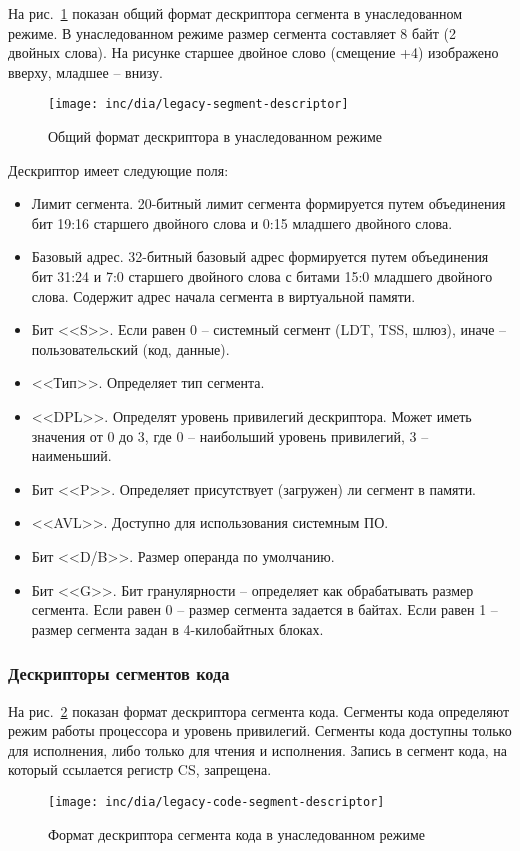 На рис.~\ref{fig:legacy-segment-descriptor-format} показан общий формат дескриптора сегмента в унаследованном режиме.
В унаследованном режиме размер сегмента составляет 8 байт (2 двойных слова). На рисунке старшее двойное слово (смещение +4)
изображено вверху, младшее -- внизу.

\begin{figure}[ht!]
  \centering
  \texttt{[image: inc/dia/legacy-segment-descriptor]}
  \caption{Общий формат дескриптора в унаследованном режиме}
  \label{fig:legacy-segment-descriptor-format}
\end{figure}

Дескриптор имеет следующие поля:
\begin{itemize}
\item Лимит сегмента. 20-битный лимит сегмента формируется путем объединения
	бит 19:16 старшего двойного слова и 0:15 младшего двойного слова.
\item Базовый адрес. 32-битный базовый адрес формируется путем объединения бит 31:24 и 7:0 старшего двойного слова
	с битами 15:0 младшего двойного слова. Содержит адрес начала сегмента в виртуальной памяти.
\item Бит <<S>>. Если равен 0 -- системный сегмент (LDT, TSS, шлюз), иначе -- пользовательский (код, данные).
\item <<Тип>>. Определяет тип сегмента.
\item <<DPL>>. Определят уровень привилегий дескриптора. Может иметь значения от 0 до 3, где 0 -- наибольший
	уровень привилегий, 3 -- наименьший.
\item Бит <<P>>. Определяет присутствует (загружен) ли сегмент в памяти.
\item <<AVL>>. Доступно для использования системным ПО.
\item Бит <<D/B>>. Размер операнда по умолчанию.
\item Бит <<G>>. Бит гранулярности -- определяет как обрабатывать размер сегмента. Если равен 0 -- размер сегмента
	задается в байтах. Если равен 1 -- размер сегмента задан в 4-килобайтных блоках.
\end{itemize}

\subsubsection*{Дескрипторы сегментов кода}
На рис.~\ref{fig:legacy-code-segment-descriptor-format} показан формат дескриптора сегмента кода.
Сегменты кода определяют режим работы процессора и уровень привилегий. Сегменты кода доступны только для исполнения,
либо только для чтения и исполнения. Запись в сегмент кода, на который ссылается регистр CS, запрещена.
\begin{figure}[ht!]
  \centering
  \texttt{[image: inc/dia/legacy-code-segment-descriptor]}
  \caption{Формат дескриптора сегмента кода в унаследованном режиме}
  \label{fig:legacy-code-segment-descriptor-format}
\end{figure}

